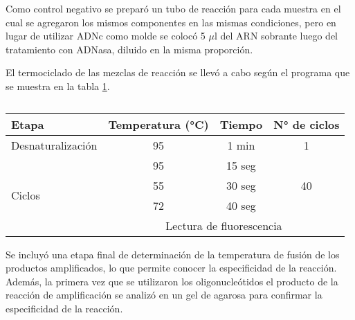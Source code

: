 Como control negativo se preparó un tubo de reacción para cada muestra en el cual se agregaron los mismos componentes en las mismas condiciones, pero en lugar de utilizar ADNc como molde se colocó 5 $\mu$l del ARN sobrante luego del tratamiento con ADNasa, diluido en la misma proporción.

El termociclado de las mezclas de reacción se llevó a cabo según el programa que se muestra en la tabla \ref{table:termociclado}.


\begin{table}[!htbp]
\centering
\small
\caption{}
\label{table:termociclado}
\begin{tabular}{|l|c|c|c|}
\hline
Etapa                   & Temperatura (°C) & Tiempo & N° de ciclos        \\ \hline
Desnaturalización       & 95               & 1 min  & 1                   \\ \hline
\multirow{4}{*}{Ciclos} & 95               & 15 seg & \multirow{3}{*}{40} \\ \cline{2-3}
                        & 55               & 30 seg &                     \\ \cline{2-3}
                        & 72               & 40 seg &                     \\ \cline{2-4} 
                        & \multicolumn{3}{c|}{Lectura de fluorescencia}   \\ \hline
\end{tabular}
\end{table}

Se incluyó una etapa final de determinación de la temperatura de fusión de los
productos amplificados, lo que permite conocer la especificidad de la reacción.
Además, la primera vez que se utilizaron los oligonucleótidos el producto de la
reacción de amplificación se analizó en un gel de agarosa para confirmar la especificidad
de la reacción.


\subsubsection{}

